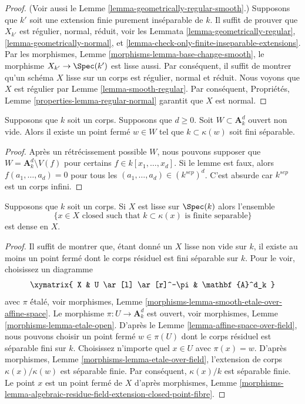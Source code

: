 \begin{proof}
(Voir aussi le Lemme
\ref{lemma-geometrically-regular-smooth}.)
Supposons que $k'$ soit une extension finie
purement inséparable de $k$. Il suffit de
prouver que $X_{k'}$ est régulier, normal,
réduit, voir les Lemmata
\ref{lemma-geometrically-regular},
\ref{lemma-geometrically-normal}, et
\ref{lemma-check-only-finite-inseparable-extensions}.
Par les morphismes, Lemme
\ref{morphisms-lemma-base-change-smooth}, le morphisme $X_{k'}
\to \Spec(k')$ est lisse aussi. Par conséquent, il suffit de
montrer qu'un schéma $X$ lisse sur un corps est régulier,
normal et réduit. Nous voyons que $X$ est régulier par Lemme
\ref{lemma-smooth-regular}. Par conséquent, Propriétés, Lemme
\ref{properties-lemma-regular-normal} garantit que $X$ est normal.
\end{proof}

\begin{lemma}
\label{lemma-affine-space-over-field}
Supposons que $k$ soit un corps. Supposons que $d \geq 0$. Soit $W
\subset \mathbf{A}^d_k$ ouvert non vide. Alors il existe un point
fermé $w \in W$ tel que $k \subset \kappa(w)$ soit fini séparable.
\end{lemma}

\begin{proof}
Après un rétrécissement possible $W$, nous pouvons supposer
que $W = \mathbf{A}^d_k \setminus V(f)$ pour certains $f
\in k[x_1, \ldots, x_d]$. Si le lemme est faux, alors
$f(a_1, \ldots, a_d) = 0$ pour tous les $(a_1, \ldots, a_d) \in
(k^{sep})^d$. C'est absurde car $k^{sep}$ est un corps infini.
\end{proof}

\begin{lemma}
\label{lemma-smooth-separable-closed-points-dense}
Supposons que $k$ soit un corps. Si $X$
est lisse sur $\Spec(k)$ alors l'ensemble
$$
\{x \in X\text{ closed such that }k \subset \kappa(x)
\text{ is finite separable}\}
$$
est dense en $X$.
\end{lemma}

\begin{proof}
Il suffit de montrer que, étant donné un $X$ lisse non vide sur
$k$, il existe au moins un point fermé dont le corps résiduel
est fini séparable sur $k$. Pour le voir, choisissez un diagramme
$$
\xymatrix{
X & U \ar[l] \ar[r]^-\pi & \mathbf{A}^d_k
}
$$
avec $\pi$ \' étalé, voir morphismes, Lemme
\ref{morphisms-lemma-smooth-etale-over-affine-space}.
Le morphisme $\pi : U \to \mathbf{A}^d_k$ est ouvert,
voir morphismes, Lemme
\ref{morphisms-lemma-etale-open}. D'après le Lemme
\ref{lemma-affine-space-over-field}, nous pouvons choisir
un point fermé $w \in \pi(U)$ dont le corps résiduel est
séparable fini sur $k$. Choisissez n'importe quel $x \in
U$ avec $\pi(x) = w$. D'après morphismes, Lemme
\ref{morphisms-lemma-etale-over-field}, l'extension de
corps $\kappa(x)/\kappa(w)$ est séparable finie. Par
conséquent, $\kappa(x)/k$ est séparable finie. Le point $x$
est un point fermé de $X$ d'après morphismes, Lemme
\ref{morphisms-lemma-algebraic-residue-field-extension-closed-point-fibre}.
\end{proof}

